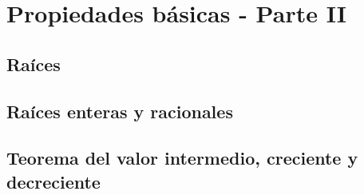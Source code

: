 \chapter{\textbf{Propiedades básicas - Parte II}}



\section{Raíces}

\section{Raíces enteras y racionales}

\section{Teorema del valor intermedio, creciente y decreciente}